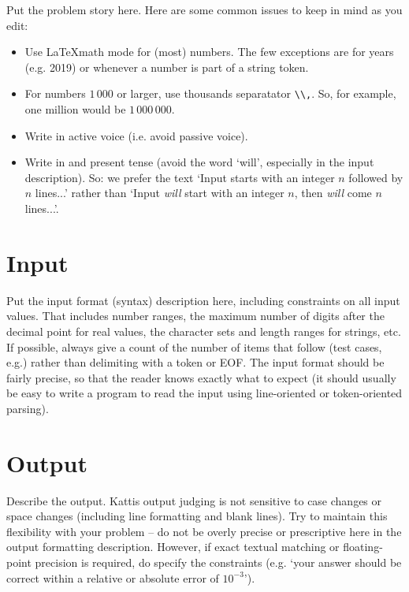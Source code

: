 

Put the problem story here. Here are some common issues to keep in mind as you
edit:
\begin{itemize}
    \item Use \LaTeX math mode for (most) numbers. The few exceptions are for
        years (e.g. 2019) or whenever a number is part of a string token.
    \item For numbers $1\,000$ or larger, use thousands separatator \verb+\\,+.
        So, for example, one million would be $1\,000\,000$.
    \item Write in active voice (i.e. avoid passive voice).
    \item Write in and present tense (avoid the word `will', especially in the
        input description). So: we prefer the text `Input starts with an
        integer $n$ followed by $n$ lines...' rather than `Input {\em will}
        start with an integer $n$, then {\em will} come $n$ lines...'.
\end{itemize}


\section*{Input}

Put the input format (syntax) description here, including constraints on all
input values. That includes number ranges, the maximum number of digits after the
decimal point for real values, the character sets and length ranges for
strings, etc. If possible, always give a count of the number of items that
follow (test cases, e.g.) rather than delimiting with a token or EOF.  The
input format should be fairly precise, so that the reader knows exactly what to
expect (it should usually be easy to write a program to read the input using
line-oriented or token-oriented parsing).

\section*{Output}

Describe the output. Kattis output judging is not sensitive to case changes or
space changes (including line formatting and blank lines). Try to maintain this
flexibility with your problem -- do not be overly precise or prescriptive here
in the output formatting description.  However, if exact textual matching or
floating-point precision is required, do specify the constraints (e.g. `your
answer should be correct within a relative or absolute error of $10^{-3}$').
